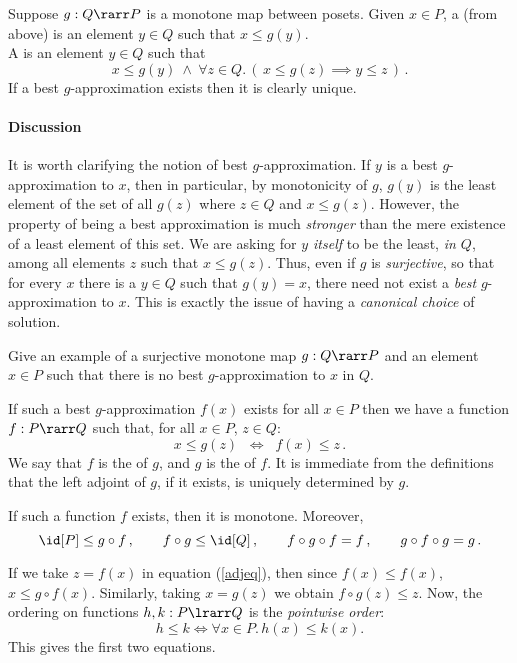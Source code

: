 \documentclass[12pt]{article}
\begin{document}
Suppose $g : Q \rarr P$ is a monotone map between posets. Given $x \in P$,
a  (from above) is an element $y \in Q$ such that $x \leq g(y)$.\\
A  is an element $y \in Q$ such that
\[ x \leq g(y)\ \land\ \forall z \in Q.\,(\, x \leq g(z) \implies y \leq z \,)\,. \]
If a best $g$-approximation exists then it is clearly unique.

\paragraph{Discussion} It is worth clarifying the notion of best $g$-approximation. If $y$ is a best $g$-approximation to $x$, then in particular, by monotonicity of $g$, $g(y)$ is the least element of the set of all $g(z)$ where $z \in Q$ and $x \leq g(z)$. However, the property of being a best approximation is much \emph{stronger} than the mere existence of a least element of this set. We are asking for \emph{$y$ itself} to be the least, \emph{in $Q$},  among all elements $z$ such that $x \leq g(z)$. Thus, even if $g$ is \emph{surjective}, so that for every $x$ there is a $y \in Q$ such that $g(y) = x$, there need not exist a \emph{best} $g$-approximation to $x$. This is exactly the issue of having a \emph{canonical choice} of solution.
\begin{myexercise}
Give an example of a surjective monotone map $g : Q \rarr P$ and an element $x \in P$ such that there is no best $g$-approximation to $x$ in $Q$.
\end{myexercise}

\noindent If such a best $g$-approximation $f(x)$ exists for all $x \in P$ then we have a function $f : P \rarr Q$ such that, for all $x \in P$, $z \in Q$:
\begin{equation}\label{adjeq}
x \leq g(z) \;\; \Longleftrightarrow \;\; f(x) \leq z\, .
\end{equation}
We say that $f$ is the  of $g$, and $g$ is the  of $f$.
It is immediate from the definitions that the left adjoint of $g$, if it exists,  is uniquely determined by $g$.

\begin{myproposition}
If such a function $f$ exists, then it is  monotone. Moreover,
\[ \id[P]\leq g\circ f\,, \qquad f \circ g \leq \id[Q]\,, \qquad f \circ g \circ f = f\,, \qquad g \circ f \circ g = g\,. \]
\end{myproposition}
\proof  If we take $z = f(x)$ in equation (\ref{adjeq}), then since $f(x) \leq f(x)$, $x \leq g
\circ f(x)$. Similarly, taking $x = g(z)$ we obtain  $f \circ g(z) \leq z$.
Now, the ordering on functions $h, k : P \lrarr Q$  is the \emph{pointwise order}:
\[ h \leq k \iff \forall x \in P. \, h(x) \leq k(x) . \]
This gives the first two equations.
\end{document}
